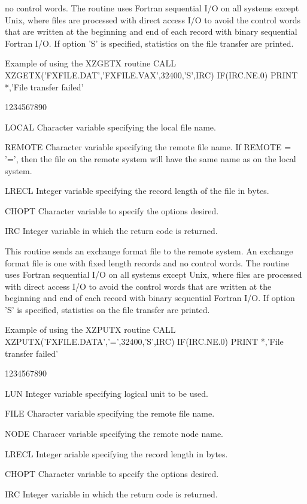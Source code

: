 no control words.
The  routine uses Fortran
sequential I/O on all systems except Unix, where files are
processed with direct access I/O to avoid the control
words that are written at the beginning and end of each
record with binary sequential Fortran I/O.
If option 'S' is specified, statistics on the file transfer
are printed.
\begin{XMPt}{Example of using the XZGETX routine}
      CALL XZGETX('FXFILE.DAT','FXFILE.VAX',32400,'S',IRC)
      IF(IRC.NE.0) PRINT *,'File transfer failed'
\end{XMPt}
\begin{DLtt}{1234567890}
\item[LOCAL]Character variable specifying the local file name.
\item[REMOTE]Character variable specifying the remote file name.
If REMOTE = '=', then the file on the remote system will
have the same name as on the local system.
\item[LRECL]Integer variable specifying the record length of the file in bytes.
\item[CHOPT]Character variable to specify the options desired.
\item[IRC]Integer variable in which the return code is returned.
\end{DLtt}
\par
This routine sends an exchange format file to the remote system.
An exchange format file is one with fixed length records and
no control words.
The  routine uses Fortran
sequential I/O on all systems except Unix, where files are
processed with direct access I/O to avoid the control
words that are written at the beginning and end of each
record with binary sequential Fortran I/O.
If option 'S' is specified, statistics on the file transfer
are printed.
\begin{XMPt}{Example of using the XZPUTX routine}
      CALL XZPUTX('FXFILE.DATA','=',32400,'S',IRC)
      IF(IRC.NE.0) PRINT *,'File transfer failed'
\end{XMPt}
\begin{DLtt}{1234567890}
\item[LUN]Integer variable specifying logical unit to be used.
\item[FILE]Character variable specifying the remote file name.
\item[NODE]Characer variable specifying the remote node name.
\item[LRECL]Integer ariable specifying the record length in bytes.
\item[CHOPT]Character variable to specify the options desired.
\item[IRC]Integer variable in which the return code is returned.
\end{DLtt}

